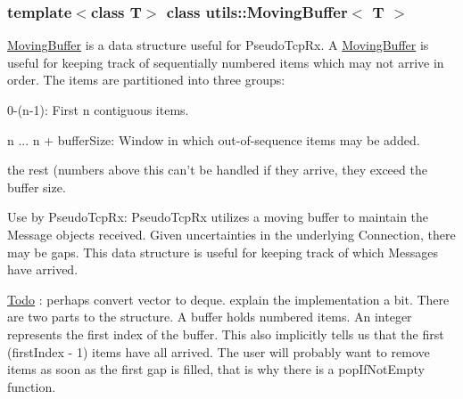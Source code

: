 \subsubsection*{template$<$class T$>$ class utils::MovingBuffer$<$ T $>$}

\hyperlink{classutils_1_1MovingBuffer}{MovingBuffer} is a data structure useful for PseudoTcpRx. A \hyperlink{classutils_1_1MovingBuffer}{MovingBuffer} is useful for keeping track of sequentially numbered items which may not arrive in order. The items are partitioned into three groups:
\begin{DoxyEnumerate}
\item 0-\/(n-\/1): First n contiguous items.
\item n ... n + bufferSize: Window in which out-\/of-\/sequence items may be added.
\item the rest (numbers above this can't be handled if they arrive, they exceed the buffer size.
\end{DoxyEnumerate}

Use by PseudoTcpRx: PseudoTcpRx utilizes a moving buffer to maintain the Message objects received. Given uncertainties in the underlying Connection, there may be gaps. This data structure is useful for keeping track of which Messages have arrived.

\begin{Desc}
\item[\hyperlink{todo__todo000002}{Todo}]: perhaps convert vector to deque. explain the implementation a bit. There are two parts to the structure. A buffer holds numbered items. An integer represents the first index of the buffer. This also implicitly tells us that the first (firstIndex -\/ 1) items have all arrived. The user will probably want to remove items as soon as the first gap is filled, that is why there is a popIfNotEmpty function. \end{Desc}


